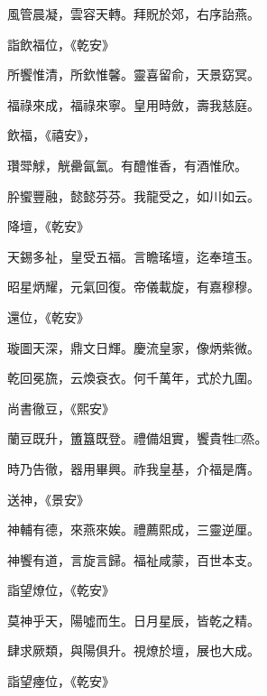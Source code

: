 \begin{pinyinscope}
 風管晨凝，雲容天轉。拜貺於郊，右序詒燕。



 詣飲福位，《乾安》



 所饗惟清，所欽惟馨。靈喜留俞，天景窈冥。



 福祿來成，福祿來寧。皇用時斂，壽我慈庭。



 飲福，《禧安》，



 瓚斝觩，觥罍氤氳。有醴惟香，有酒惟欣。



 肸蠁豐融，懿懿芬芬。我龍受之，如川如云。



 降壇，《乾安》



 天錫多祉，皇受五福。言瞻瑤壇，迄奉瑄玉。



 昭星炳耀，元氣回復。帝儀載旋，有嘉穆穆。



 還位，《乾安》



 璇圖天深，鼎文日輝。慶流皇家，像炳紫微。



 乾回冕旒，云煥袞衣。何千萬年，式於九圍。



 尚書徹豆，《熙安》



 蘭豆既升，簠簋既登。禮備俎實，饗貴牲□烝。



 時乃告徹，器用畢興。祚我皇基，介福是膺。



 送神，《景安》



 神輔有德，來燕來娭。禮薦熙成，三靈逆厘。



 神饗有道，言旋言歸。福祉咸蒙，百世本支。



 詣望燎位，《乾安》



 莫神乎天，陽噓而生。日月星辰，皆乾之精。



 肆求厥類，與陽俱升。視燎於壇，展也大成。



 詣望瘞位，《乾安》




\end{pinyinscope}
